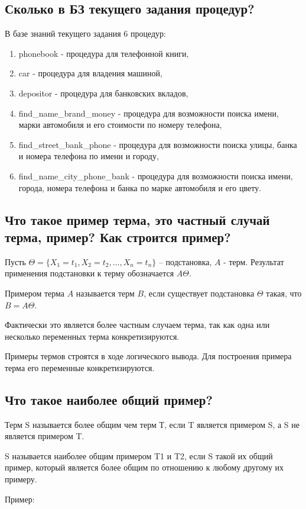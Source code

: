 \documentclass[a4paper,12pt]{article}
\begin{document}
\subsection*{Сколько в БЗ текущего задания процедур?
}
В базе знаний текущего задания 6 процедур:
\begin{enumerate}
	\item phonebook - процедура для телефонной книги,
	\item car - процедура для владения машиной,
	\item depositor - процедура для банковских вкладов,
	\item find\_name\_brand\_money - процедура для возможности поиска имени, марки автомобиля и его стоимости по номеру телефона,
	\item find\_street\_bank\_phone - процедура для возможности поиска улицы, банка и номера телефона по имени и городу,
	\item find\_name\_city\_phone\_bank - процедура для возможности поиска имени, города, номера телефона и банка по марке автомобиля и его цвету.
\end{enumerate}
\subsection*{Что такое пример терма, это частный случай терма, пример? Как строится пример? }
Пусть $\Theta =  \{X_1 = t_1, X_2= t_2, \dots , X_n = t_n \}$   –   подстановка, $A$ - терм. Результат применения подстановки к терму обозначается $A\Theta$.

Примером терма $A$ называется терм $B$, если существует подстановка $\Theta$ такая, что $B = A\Theta$.

Фактически это является более частным случаем терма, так как одна или несколько переменных терма конкретизируются.

Примеры термов строятся в ходе логического вывода. Для построения примера терма его переменные конкретизируются.
\subsection*{Что такое наиболее общий пример?
}
Терм S называется более общим чем терм Т, если T является примером S, а S не является примером T.

S называется наиболее общим примером T1 и T2, если S такой их общий пример, который является более общим по отношению к любому другому их примеру. 

Пример:
\end{document}
